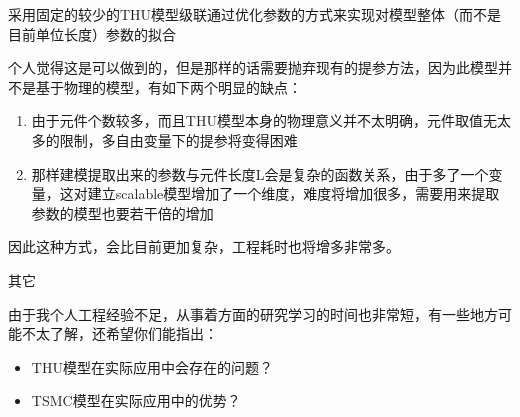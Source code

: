 \documentclass[UTF8,a4paper,zihao=-4]{ctexart}
\begin{document}
\vspace{0.2 cm}
\noindent
{\heiti 采用固定的较少的THU模型级联通过优化参数的方式来实现对模型整体（而不是目前单位长度）参数的拟合}\vspace{0.2 cm}
\par
个人觉得这是可以做到的，但是那样的话需要抛弃现有的提参方法，因为此模型并不是基于物理的模型，有如下两个明显的缺点：
\begin{enumerate}[itemsep=1pt, topsep=12pt, partopsep=0pt,label={(\arabic*)}] %
  \item 由于元件个数较多，而且THU模型本身的物理意义并不太明确，元件取值无太多的限制，多自由变量下的提参将变得困难
  \item 那样建模提取出来的参数与元件长度L会是复杂的函数关系，由于多了一个变量，这对建立scalable模型增加了一个维度，难度将增加很多，需要用来提取参数的模型也要若干倍的增加
\end{enumerate}
因此这种方式，会比目前更加复杂，工程耗时也将增多非常多。
\vspace{0.2 cm}


\vspace{0.2 cm}
\noindent
{\heiti 其它}\vspace{0.2 cm}
\par
由于我个人工程经验不足，从事着方面的研究学习的时间也非常短，有一些地方可能不太了解，还希望你们能指出：
\begin{itemize}
  \item THU模型在实际应用中会存在的问题？
  \item TSMC模型在实际应用中的优势？
\end{itemize}
\vspace{0.2 cm}

\end{document}
